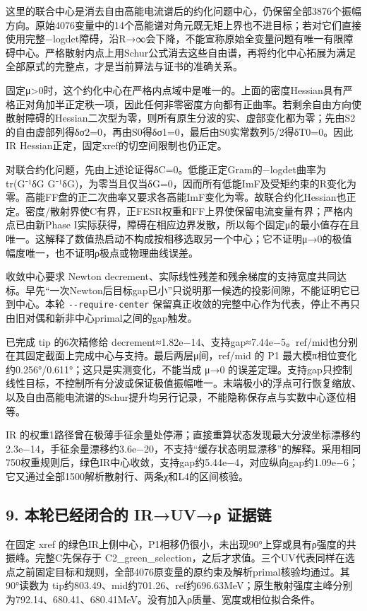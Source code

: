 \documentclass[
  11pt,
  a4paper,
]{article}
\begin{document}
这里的联合中心是消去自由高能电流谱后的约化问题中心，仍保留全部3876个振幅方向。原始4076变量中的14个高能谱对角元既无矩上界也不进目标；若对它们直接使用完整−logdet障碍，沿R→∞会下降，不能宣称原始全变量问题有唯一有限障碍中心。严格散射内点上用Schur公式消去这些自由谱，再将约化中心拓展为满足全部原式的完整点，才是当前算法与证书的准确关系。

固定μ\textgreater0时，这个约化中心在严格内点域中是唯一的。上面的密度Hessian具有严格正对角加半正定秩一项，因此任何非零密度方向都有正曲率。若剩余自由方向使散射障碍的Hessian二次型为零，则所有原生分波的实、虚部变化都为零；先由S2的自由虚部列得δσ2=0，再由S0得δσ1=0，最后由S0实常数列5/2得δT0=0。因此IR
Hessian正定，固定xref的切空间限制也仍正定。

对联合约化问题，先由上述论证得δC=0。低能正定Gram的−logdet曲率为 tr(G⁻¹δG
G⁻¹δG)，为零当且仅当δG=0，因而所有低能ImF及受矩约束的R变化为零。高能FF盘的正二次曲率又要求各高能ImF变化为零。故联合约化Hessian也正定。密度/散射界使C有界，正FESR权重和FF上界使保留电流变量有界；严格内点已由新Phase
I实际获得，障碍在相应边界发散，所以每个固定μ的最小值存在且唯一。这解释了数值热启动不构成按相移选取另一个中心；它不证明μ→0的极值幅度唯一，也不证明ρ极点或物理曲线误差。

收敛中心要求 Newton
decrement、实际线性残差和残余梯度的支持宽度共同达标。早先``一次Newton后目标gap已小''只说明那一候选的投影间隙，不能证明它已到中心。本轮
\texttt{-\/-require-center}
保留真正收敛的完整中心作为代表，停止不再只由旧对偶和新非中心primal之间的gap触发。

已完成 tip 的6次精修给
decrement≈1.82e−14、支持gap≈7.44e−5。ref/mid也分别在其固定截面上完成中心与支持。最后两层μ间，ref/mid
的 P1 最大模π相位变化约0.256°/0.611°；这只是实测变化，不能当成 μ→0
的误差定理。支持gap只控制线性目标，不控制所有分波或保证极值振幅唯一。末端极小的浮点可行恢复缩放、以及自由高能电流谱的Schur提升均另行记录，不能隐称保存点与实数中心逐位相等。

IR
的权重1路径曾在极薄手征余量处停滞；直接重算状态发现最大分波坐标漂移约2.3e−14，手征余量漂移约3.6e−20，不支持``缓存状态明显漂移''的解释。采用相同750权重规则后，绿色IR中心收敛，支持gap约5.44e−4，对应纵向gap约1.09e−6；它又通过全部1500解析散射行、两条χ和L4的区间核验。

\subsection{9. 本轮已经闭合的 IR→UV→ρ
证据链}\label{ux672cux8f6eux5df2ux7ecfux95edux5408ux7684-iruvux3c1-ux8bc1ux636eux94fe}

在固定 xref
的绿色IR上侧中心，P1相移仍很小，未出现90°上穿或具有ρ强度的共振峰。完整C先保存于
C2\_green\_selection，之后才求值。三个UV代表同样在选点之前固定目标和规则，全部4076原变量的原约束及解析primal核验均通过。其90°读数为
tip约803.49、mid约701.26、ref约696.63MeV；原生散射强度主峰分别为792.14、680.41、680.41MeV。没有加入ρ质量、宽度或相位拟合条件。
\end{document}
